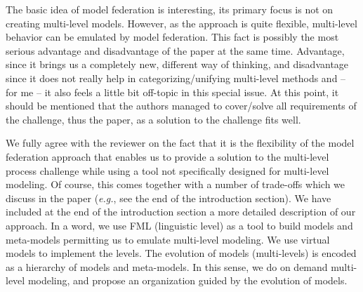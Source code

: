 \documentclass[10pt]{article}
\begin{document}
\begin{response}{The basic idea of model federation is interesting, its primary focus is not on creating multi-level models. However, as the approach is quite flexible, multi-level behavior can be emulated by model federation. This fact is possibly the most serious advantage and disadvantage of the paper at the same time. Advantage, since it brings us a completely new, different way of thinking, and disadvantage since it does not really help in categorizing/unifying multi-level methods and -- for me -- it also feels a little bit off-topic in this special issue. At this point, it should be mentioned that the authors managed to cover/solve all requirements of the challenge, thus the paper, as a solution to the challenge fits well.}

We fully agree with the reviewer on the fact that it is the flexibility of the model federation approach that enables us to provide a solution to the multi-level process challenge while using a tool not specifically designed for multi-level modeling. Of course, this comes together with a number of trade-offs which we discuss in the paper (\emph{e.g.}, see the end of the introduction section).%
We have included at the end of the introduction section a more detailed description of our approach. In a word, we use FML (linguistic level) as a tool to build models and meta-models permitting us to emulate multi-level modeling. We use virtual models to implement the levels. The evolution of models (multi-levels) is encoded as a hierarchy of models and meta-models. In this sense, we do on demand multi-level modeling, and propose an organization guided by the evolution of models.%



\end{response}
\end{document}
